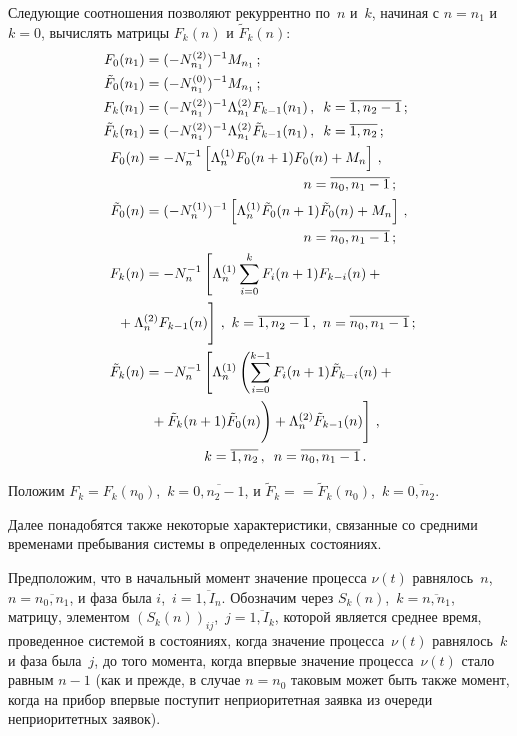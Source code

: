 \begin{multicols}{2}
Следующие соотношения позволяют рекуррентно по~$n$ и~$k$, начиная
с $n=n_1$ и $k=0$, вычислять мат\-ри\-цы $F_k(n)$ и $\tilde F_k(n)$:
\begin{align*}
F_0(n_1) &= (-N^{(2)}_{n_1})^{-1} M_{n_1}\,;
\\
\tilde F_0(n_1) & = (-N^{(0)}_{n_1})^{-1} M_{n_1}\,;
\\
F_k(n_1) & = (-N^{(2)}_{n_1})^{-1} \Lambda^{(2)}_{n_1}
F_{k-1}(n_1)\,, \enskip k=\overline{1,n_2-1}\,;
\\
\tilde F_k(n_1) & = (-N^{(2)}_{n_1})^{-1} \Lambda^{(2)}_{n_1}
\tilde F_{k-1}(n_1)\,, \enskip  k=\overline{1,n_2}\,;
\\
F_0(n) & = -N_{n}^{-1} \left[ \Lambda^{(1)}_{n} F_0(n+1) F_0(n) + M_{n} \right]\,,\\
&\hspace*{40mm} n=\overline{n_0,n_1-1}\,;
\\
\tilde F_0(n) & =
(-N^{(1)}_{n})^{-1} \left[ \Lambda^{(1)}_{n}
\tilde F_0(n+1) \tilde F_0(n) + M_{n} \right]\,,\\
&\hspace*{40mm} n=\overline{n_0,n_1-1}\,;
\\
F_k(n) &=
-N_{n}^{-1} \left[ \Lambda^{(1)}_{n}
\sum\limits_{i=0}^{k} F_i(n+1) F_{k-i}(n)
+{}\right.\\
&\hspace*{-8mm}\left.{}+ \Lambda^{(2)}_{n} F_{k-1}(n)
\vphantom{\sum\limits_{i}^k}\right]\,, \  k=\overline{1,n_2-1}\,,  \ n=\overline{n_0,n_1-1}\,;
\\
\tilde F_k(n) &=
-N_{n}^{-1} \left[
\Lambda^{(1)}_{n}
\left( \sum\limits_{i=0}^{k-1} F_i(n+1) \tilde F_{k-i}(n)
+{}\right.\right.\\
&\left.\left.{}+ \tilde F_k(n+1) \tilde F_0(n)
\vphantom{\sum\limits_{i=0}^k}
\right)
+
\Lambda^{(2)}_{n} \tilde F_{k-1}(n)
\vphantom{\sum\limits_{i=0}^k}
\right]\,,\\
&  \hspace*{15mm}k=\overline{1,n_2}\,,
 \enskip n=\overline{n_0,n_1-1}\,.
\end{align*}

Положим $F_k = F_k(n_0)$,\  $k=\overline{0,n_2-1}$, и
$\tilde F_k=$\linebreak $=\tilde F_k(n_0)$,\ $k=\overline{0,n_2}$.

Далее понадобятся также некоторые характеристики, связанные со
средними временами пребывания системы в определенных состояниях.

Предположим, что в начальный момент значение процесса $\nu(t)$
равнялось~$n$,\ \ $n=\overline{n_0,n_1}$, и фаза была $i$,\ 
$i=\overline{1,I_{n}}$.
Обозначим через $S_k(n)$,\ $k=\overline{n,n_1}$,
матрицу, элементом $(S_k(n))_{ij}$,\  $j=\overline{1,I_{k}}$,
которой является среднее время, проведенное сис\-те\-мой в состояниях,
когда значение процесса~$\nu(t)$ равнялось~$k$ и фаза
была~$j$, до того момента, когда
впервые значение процесса~$\nu(t)$ стало равным $n-1$
(как и прежде, в случае $n=n_0$ таковым может быть
также момент, когда на прибор впервые поступит неприоритетная
заявка из очереди неприоритетных заявок).


\end{multicols}
